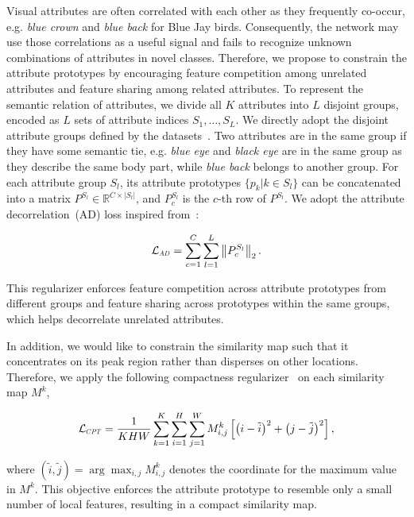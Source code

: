 Visual attributes are often correlated with each other as they frequently co-occur, e.g. \textit{blue crown} and \textit{blue back} for Blue Jay birds. 
Consequently, the network may use those correlations as a useful signal and fails to recognize unknown combinations of attributes in novel classes.
Therefore, we propose to constrain the attribute prototypes by encouraging feature competition among unrelated attributes and feature sharing among related attributes. To represent the semantic relation of attributes, we divide all $K$ attributes into $L$ disjoint groups, encoded as $L$ sets of attribute indices $S_1,\dots, S_L$. We directly adopt the disjoint attribute groups defined by the datasets~\citep{26_wah2011caltech,32_awa,25_SUNdataset}.
Two attributes are in the same group if they have some semantic tie, e.g. \textit{blue eye} and \textit{black eye} are in the same group as they describe the same body part, while \textit{blue back} belongs to another group.  
For each attribute group $S_l$, its attribute prototypes $\{p_k|k \in S_l\}$ can be concatenated into a matrix $P^{S_l} \in \mathbb{R}^{C \times |S_l|}$, and $P^{S_l}_c$ is the $c$-th row of $P^{S_l}$. We adopt the attribute decorrelation~(AD) loss inspired from~\citet{jayaraman2014decorrelating}: 
\begin{linenomath*}
\begin{equation}
    \label{eq:ad}
     \mathcal{L}_{\Scale[0.6]{AD}}  =  \sum\limits_{c = 1}^{C} \sum\limits_{l = 1}^{L} {\left \| P^{S_l}_c  \right \|_2} \,.
\end{equation}
\end{linenomath*}
This regularizer enforces feature competition across attribute prototypes from different groups and feature sharing across prototypes within the same groups, which helps decorrelate unrelated attributes. 





In addition, we would like to constrain the similarity map such that it concentrates on its peak region rather than disperses on other locations.  Therefore, we apply the following compactness regularizer~\citep{zheng2017learning} on each similarity map $M^k$,
\begin{linenomath*}
\begin{equation}
\mathcal{L}_{\Scale[0.6]{CPT}}  = \frac{1}{KHW} \sum_{k=1}^{K} \sum_{i=1}^{H} \sum_{j=1}^{W}  {M_{i,j}^k \left [ {\left ( i - \tilde{i} \right )}^2 + {\left ( j - \tilde{j} \right )}^2  \right ]} \,,
\end{equation}
\end{linenomath*}
where $(\tilde{i}, \tilde{j}) = \arg\max_{i, j} M^k_{i, j}$ denotes the coordinate for the maximum value in $M^k$. This objective enforces the attribute prototype to resemble only a small number of local features, resulting in a compact similarity map. 



